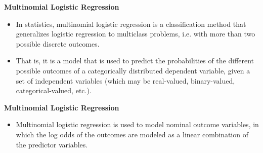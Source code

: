 \documentclass[00-GLMregslides.tex]{subfiles}
\begin{document}
	
\begin{frame}
\Large
	
\textbf{Multinomial Logistic Regression}\\
\bigskip
\begin{itemize}
\item In statistics, multinomial logistic regression is a classification method that generalizes logistic regression to multiclass problems, 
i.e. with more than two possible discrete outcomes.
\item That is, it is a model that is used to predict the probabilities of the different possible outcomes of a 
categorically distributed dependent variable, given a set of independent 
variables (which may be real-valued, binary-valued, categorical-valued, etc.).
\end{itemize}
 
\end{frame}
	
\begin{frame}
\Large
	
\textbf{Multinomial Logistic Regression}\\
\bigskip
\begin{itemize}
\item Multinomial logistic regression is used to model nominal outcome variables, in which the log odds of the outcomes are modeled as a linear combination of the predictor variables.
\end{itemize}
 
\end{frame}
\end{document}
